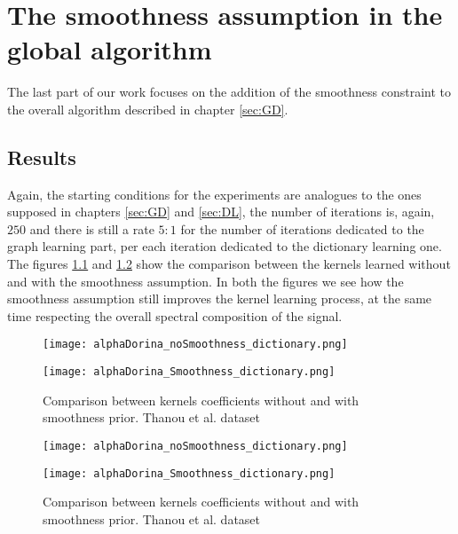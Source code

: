 \chapter{The smoothness assumption in the global algorithm}
The last part of our work focuses on the addition of the smoothness constraint to the overall algorithm described in chapter \ref{sec:GD}.
\section{Results}
Again, the starting conditions for the experiments are analogues to the ones supposed in chapters \ref{sec:GD} and \ref{sec:DL}, the number of iterations is, again, $250$ and there is still a rate $5:1$ for the number of iterations dedicated to the graph learning part, per each iteration dedicated to the dictionary learning one.
\\

The figures \ref{fig:alphaHeatGD_smth} and \ref{fig:alphaDorinaGD_smth} show the comparison between the kernels learned without and with the smoothness assumption. In both the figures we see how the smoothness assumption still improves the kernel learning process, at the same time respecting the overall spectral composition of the signal.

\begin{figure}
  \centering
  \begin{minipage}[c]{.8\textwidth}
    \centering
    \texttt{[image: alphaDorina\_noSmoothness\_dictionary.png]}
  \end{minipage}
  \begin{minipage}[c]{.8\textwidth}
    \centering
    \texttt{[image: alphaDorina\_Smoothness\_dictionary.png]}
  \end{minipage}
  \caption{Comparison between kernels coefficients without and with smoothness prior. Thanou et al.   dataset}
  \label{fig:alphaHeatGD_smth}
\end{figure}

\begin{figure}
  \centering
  \begin{minipage}[c]{.8\textwidth}
    \centering
    \texttt{[image: alphaDorina\_noSmoothness\_dictionary.png]}
  \end{minipage}
  \begin{minipage}[c]{.8\textwidth}
    \centering
    \texttt{[image: alphaDorina\_Smoothness\_dictionary.png]}
  \end{minipage}
  \caption{Comparison between kernels coefficients without and with smoothness prior. Thanou et al.   dataset}
  \label{fig:alphaDorinaGD_smth}
\end{figure}

